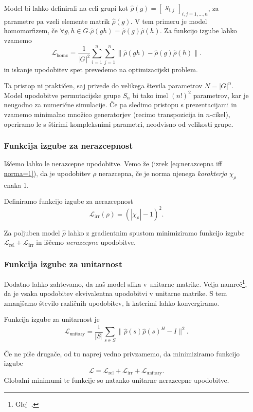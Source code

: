 \documentclass[mat2, tisk]{fmfdelo}
\newcommand{\loss}{\mathcal L}
\newcommand{\Loss}[1]{\mathcal L _\text{#1}}
\begin{document}
\begin{opomba}
  Model bi lahko definirali na celi grupi kot $\hat\rho(g)=
  \begin{bmatrix}
    g_{i,j}
  \end{bmatrix}_{i,j=1,\dotsc, n}$, za parametre pa vzeli
  elemente matrik $\hat\rho(g)$. V tem primeru je model
  homomorfizem, če $\forall g, h \in G.
  \hat\rho(gh)=\hat\rho(g) \hat\rho(h)$. Za funkcijo izgube lahko vzamemo
  $$
  \Loss{homo} = \frac{1}{|G|^2}\sum_{i=1}^n \sum_{j=1}^n \|
  \hat\rho(gh)-\hat\rho(g) \hat\rho(h)\|.
  $$
  in iskanje upodobitev spet prevedemo na optimizacijski problem.

  Ta pristop ni praktičen, saj privede do velikega števila
  parametrov $N=|G|^n$. Model upodobitve permutacijske grupe
  $S_n$ bi tako imel $(n!)^2$ parametrov, kar je neugodno za
  numerične simulacije. Če pa sledimo pristopu s prezentacijami
  in vzamemo minimalno množico generatorjev (recimo
  transpozicija in $n$-cikel), operiramo le s štirimi
  kompleksnimi parametri, neodvisno od velikosti grupe.
\end{opomba}
\subsubsection{Funkcija izgube za nerazcepnost}
Iščemo lahko le nerazcepne upodobitve. Vemo že (izrek
\ref{eq:nerazcepna iff norma=1}), da je upodobitev $\rho$
nerazcepna, če je norma njenega \emph{karakterja} $\chi_\rho$ enaka 1.

\begin{definicija}
  Definiramo funkcijo izgube za nerazcepnost
  \begin{equation}
    \label{eq:irr loss}
    \Loss{irr}(\rho) = (|\chi_\rho| - 1)^2.
  \end{equation}
\end{definicija}
Za poljuben model $\hat \rho$ lahko z gradientnim spustom
minimiziramo funkcijo izgube $\Loss{rel} + \Loss{irr}$ in
iščemo \emph{nerazcepne} upodobitve.
\subsubsection{Funkcija izgube za unitarnost}
Dodatno lahko zahtevamo, da naš model slika v unitarne matrike.
Velja namreč\footnote{Glej~\cite[trditev
3.34]{jezernik2025upodobitve}.}, da je vsaka upodobitev
ekvivalentna upodobitvi v unitarne matrike.
S tem zmanjšamo število različnih upodobitev, h katerimi lahko
konvergiramo.
\begin{definicija}
  Funkcija izgube za unitarnost je
  \begin{equation}
    \label{eq: unitary loss}
    \Loss{unitary} = \frac{1}{|S|} \sum \limits_{s \in S}
    \|\hat\rho(s) \hat\rho(s)^H - I\|^2.
  \end{equation}
\end{definicija}
Če ne piše drugače, od tu naprej vedno privzamemo, da
minimiziramo funkcijo izgube
$$\loss = \Loss{rel} + \Loss{irr} +
\Loss{unitary}.$$
Globalni minimumi te funkcije so natanko
unitarne nerazcepne upodobitve.
\end{document}
